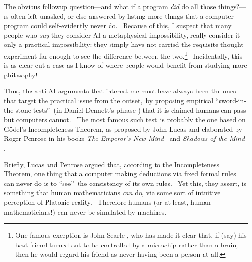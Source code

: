\documentclass[12pt,onecolumn]{article}%
\begin{document}
The obvious followup question---and what if a program \textit{did} do all
those things?---is often left unasked, or else answered by listing more things
that a computer program could self-evidently never do. \ Because of this, I
suspect that many people who \textit{say} they consider AI a metaphysical
impossibility, really consider it only a practical impossibility: they simply
have not carried the requisite thought experiment far enough to see the
difference between the two.\footnote{One famous exception is John Searle
\cite{searle}, who has made it clear that, if (say) his best friend turned out
to be controlled by a microchip rather than a brain, then he would regard his
friend as never having been a person at all.} \ Incidentally, this is as
clear-cut a case as I know of where people would benefit from studying more philosophy!

Thus, the anti-AI arguments that interest me most have always been the ones
that target the practical issue from the outset,\ by proposing empirical
\textquotedblleft sword-in-the-stone tests\textquotedblright\ (in Daniel
Dennett's phrase \cite{dennett}) that it is claimed humans can pass but
computers cannot. \ The most famous such test\ is probably the one based on
G\"{o}del's Incompleteness Theorem, as proposed by John Lucas \cite{lucas} and
elaborated by Roger Penrose in his books \textit{The Emperor's New Mind}
\cite{penrose}\ and \textit{Shadows of the Mind} \cite{penrose:shadows}.

Briefly, Lucas and Penrose argued that, according to the Incompleteness
Theorem, one thing that a computer making deductions via fixed formal rules
can never do is to \textquotedblleft see\textquotedblright\ the consistency of
its own rules. \ Yet this, they assert, is something that human mathematicians
\textit{can} do, via some sort of intuitive perception of Platonic reality.
\ Therefore humans (or at least, human mathematicians!) can never be simulated
by machines.
\end{document}

